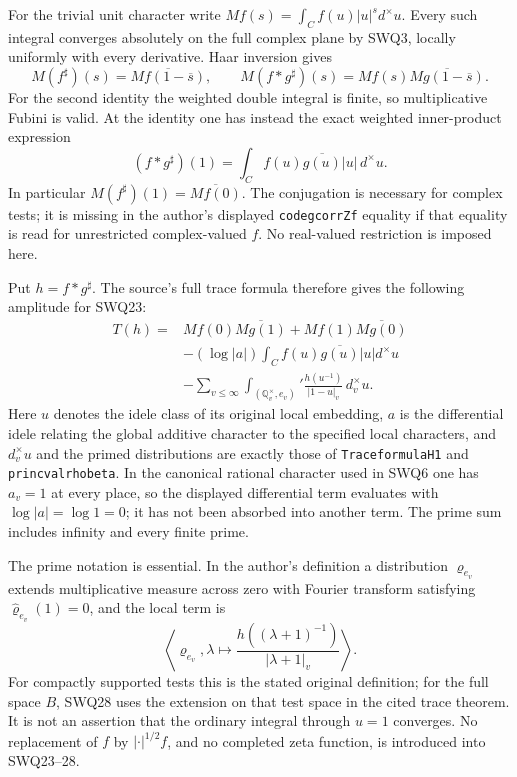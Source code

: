 \documentclass[11pt]{article}
\begin{document}
For the trivial unit character write
$M f(s)=\int_C f(u)|u|^s d^{\times}u$. Every such integral
converges absolutely on the full complex plane by SWQ3, locally
uniformly with every derivative. Haar inversion gives
\begin{equation}\tag{SWQ26}
 M(f^{\sharp})(s)=\overline{M f(1-\overline s)},\qquad
 M(f*g^{\sharp})(s)=M f(s)\overline{M g(1-\overline s)}.
\end{equation}
For the second identity the weighted double integral is finite,
so multiplicative Fubini is valid. At the identity one has instead
the exact weighted inner-product expression
\begin{equation}\tag{SWQ27}
 (f*g^{\sharp})(1)
    =\int_C f(u)\overline{g(u)}|u|\,d^{\times}u.
\end{equation}
In particular $M(f^{\sharp})(1)=\overline{M f(0)}$.
The conjugation is necessary for complex tests; it is missing in
the author's displayed \texttt{codegcorrZf} equality if that equality
is read for unrestricted complex-valued $f$. No real-valued
restriction is imposed here.

Put $h=f*g^{\sharp}$. The source's full trace formula therefore
gives the following amplitude for SWQ23:
\begin{equation}\tag{SWQ28}
\begin{split}
 T(h)={}&M f(0)\overline{M g(1)}
       +M f(1)\overline{M g(0)}\\
 &-(\log|a|)\int_C f(u)\overline{g(u)}|u|d^{\times}u\\
 &-\sum_{v\le\infty}\int_{(\mathbb Q_v^{\times},e_v)}'
                \frac{h(u^{-1})}{|1-u|_v}\,d_v^{\times}u.
\end{split}
\end{equation}
Here $u$ denotes the idele class of its original local embedding,
$a$ is the differential idele relating the global additive character
to the specified local characters, and $d_v^{\times}u$ and the
primed distributions are exactly those of
\texttt{TraceformulaH1} and \texttt{princvalrhobeta}.
In the canonical rational character used in SWQ6 one has $a_v=1$
at every place, so the displayed differential term evaluates with
$\log|a|=\log1=0$; it has not been absorbed into another term.
The prime sum includes infinity and every finite prime.

The prime notation is essential. In the author's definition a
distribution $\varrho_{e_v}$ extends multiplicative measure across
zero with Fourier transform satisfying
$\widehat\varrho_{e_v}(1)=0$, and the local term is
\[
 \left\langle\varrho_{e_v},
   \lambda\longmapsto
       \frac{h((\lambda+1)^{-1})}{|\lambda+1|_v}\right\rangle.
\]
For compactly supported tests this is the stated original definition;
for the full space $B$, SWQ28 uses the extension on that test space
in the cited trace theorem. It is not an assertion that the ordinary
integral through $u=1$ converges. No replacement of $f$ by
$|\cdot|^{1/2}f$, and no completed zeta function, is introduced
into SWQ23--28.
\end{document}
